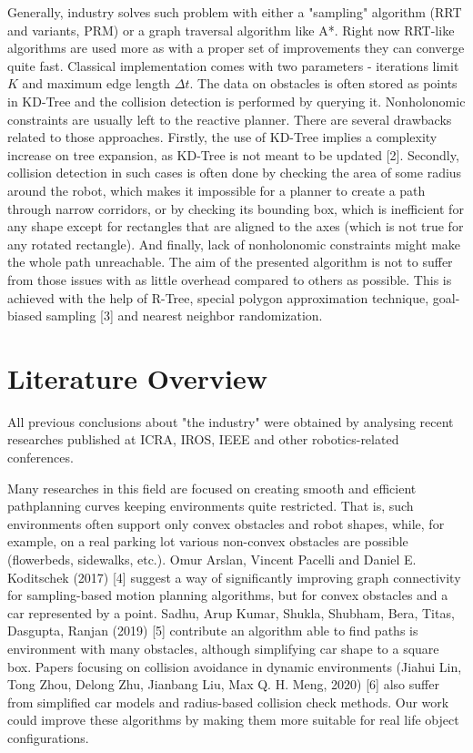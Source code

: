 \documentclass[a4paper,12pt]{article}
\DeclareRobustCommand{\[}{\begin{equation}}
\DeclareRobustCommand{\]}{\end{equation}}
\numberwithin{equation}{section}
\numberwithin{algorithm}{section}
\begin{document}
Generally, industry solves such problem with either a "sampling" algorithm (RRT and variants, PRM) or a graph traversal algorithm like A*. Right now RRT-like algorithms are used more as with a proper set of improvements they can converge quite fast. Classical implementation comes with two parameters - iterations limit $K$ and maximum edge length $\Delta{t}$. The data on obstacles is often stored as points in KD-Tree and the collision detection is performed by querying it. Nonholonomic constraints are usually left to the reactive planner. There are several
drawbacks related to those approaches. Firstly, the use of KD-Tree implies a complexity increase on tree expansion, as KD-Tree is not meant to be updated [2]. Secondly, collision detection in such cases is often done by checking the area of some radius around the robot, which makes it impossible for a planner to create a path through narrow corridors, or by checking its bounding box, which is inefficient for any shape except for rectangles that are aligned to the axes (which is not true for any rotated rectangle). And finally, lack of nonholonomic constraints might make the whole path unreachable. The aim of the presented algorithm is not to suffer from those issues with as little overhead compared to others as possible.
This is achieved with the help of R-Tree, special polygon approximation technique, goal-biased sampling [3] and nearest neighbor randomization.

\section{Literature Overview}

All previous conclusions about "the industry" were obtained by analysing recent researches published at ICRA, IROS, IEEE and other robotics-related conferences.

Many researches in this field are focused on creating smooth and efficient pathplanning curves keeping environments quite restricted. That is, such environments often support only convex obstacles and robot shapes, while, for example, on a real parking lot various non-convex obstacles are possible (flowerbeds, sidewalks, etc.). Omur Arslan, Vincent Pacelli and Daniel E. Koditschek (2017) [4] suggest a way of significantly improving graph connectivity for sampling-based motion planning algorithms, but for convex obstacles and a car represented by a point. Sadhu, Arup Kumar, Shukla, Shubham, Bera, Titas, Dasgupta, Ranjan (2019) [5] contribute an algorithm able to find paths is environment with many obstacles, although simplifying car shape to a square box. Papers focusing on collision avoidance in dynamic environments (Jiahui Lin, Tong Zhou, Delong Zhu, Jianbang Liu, Max Q. H. Meng, 2020) [6] also suffer from simplified car models and radius-based collision check methods. Our work could improve these algorithms by making them more suitable for real life object configurations.
\end{document}
